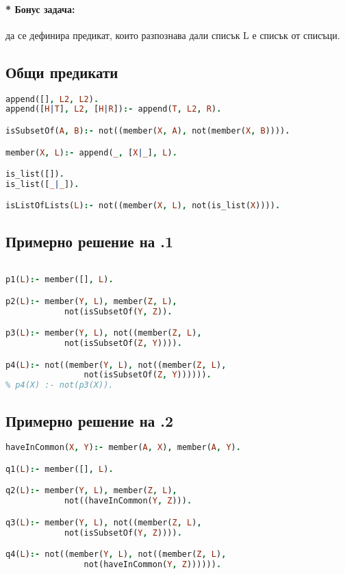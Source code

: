 \documentclass{article}
\begin{document}
\paragraph{\hspace{0.5em} * Бонус задача:} да се дефинира предикат, които разпознава дали списък L е списък от списъци.

\subsection{Общи предикати}
\begin{addmargin}[1em]{2em}
\begin{lstlisting}[language=Prolog]
append([], L2, L2).
append([H|T], L2, [H|R]):- append(T, L2, R).

isSubsetOf(A, B):- not((member(X, A), not(member(X, B)))).

member(X, L):- append(_, [X|_], L).

is_list([]).
is_list([_|_]).

isListOfLists(L):- not((member(X, L), not(is_list(X)))).

\end{lstlisting}
\end{addmargin}

\vskip 0.2in

\subsection{Примерно решение на .1} 
\begin{addmargin}[1em]{2em}
\begin{lstlisting}[language=Prolog]

p1(L):- member([], L).

p2(L):- member(Y, L), member(Z, L), 
			not(isSubsetOf(Y, Z)).

p3(L):- member(Y, L), not((member(Z, L), 
			not(isSubsetOf(Z, Y)))).

p4(L):- not((member(Y, L), not((member(Z, L), 
				not(isSubsetOf(Z, Y)))))).
% p4(X) :- not(p3(X)).
\end{lstlisting}
\end{addmargin}

\vskip 0.2in

\subsection{Примерно решение на .2} 
\begin{addmargin}[1em]{2em}
\begin{lstlisting}[language=Prolog]
haveInCommon(X, Y):- member(A, X), member(A, Y).

q1(L):- member([], L).

q2(L):- member(Y, L), member(Z, L), 
			not((haveInCommon(Y, Z))).

q3(L):- member(Y, L), not((member(Z, L), 
			not(isSubsetOf(Y, Z)))).

q4(L):- not((member(Y, L), not((member(Z, L), 
				not(haveInCommon(Y, Z)))))).
\end{lstlisting}
\end{addmargin}
\end{document}
